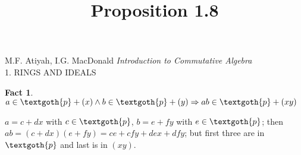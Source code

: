 \documentclass{article}
\title{Proposition 1.8}
\newtheorem*{fact}{Fact}
\begin{document}
\maketitle

\begin{center}
M.F. Atiyah, I.G. MacDonald \emph{Introduction to Commutative Algebra}\\
1. RINGS AND IDEALS
\end{center}

\vspace*{10px} 

\begin{fact}
$a \in \textgoth{p} + (x) \wedge b \in \textgoth{p} + (y) \Rightarrow ab \in \textgoth{p} + (xy)$
\end{fact}

\vspace*{10px} 

$a = c + dx$ with $c \in \textgoth{p}$, $b = e + fy$ with $e \in \textgoth{p}$; then $ab = (c + dx)(e + fy) = ce + cfy + dex + dfy$; but first three are in $\textgoth{p}$ and last is in $(xy)$. 
\end{document}
